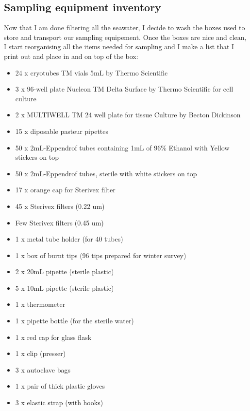 \subsection{Sampling equipment inventory}
\label{task:20180308_cj0}

Now that I am done filtering all the seawater, I decide to wash the boxes used to store and transport our sampling equipement. Once the boxes are nice and clean, I start reorganising all the items needed for sampling and I make a list that I print out and place in and on top of the box:

\begin{itemize}
\item 24 x cryotubes TM vials 5mL by Thermo Scientific
\item 3 x 96-well plate Nucleon TM Delta Surface by Thermo Scientific for cell culture
\item 2 x MULTIWELL TM 24 well plate for tissue Culture by Becton Dickinson
\item 15 x diposable pasteur pipettes
\item 50 x 2mL-Eppendrof tubes containing 1mL of 96\% Ethanol with Yellow stickers on top
\item 50 x 2mL-Eppendrof tubes, sterile with white stickers on top
\item 17 x orange cap for Sterivex filter
\item 45 x Sterivex filters (0.22 um)
\item Few Sterivex filters (0.45 um)
\item 1 x metal tube holder (for 40 tubes)
\item 1 x box of burnt tips (96 tips prepared for winter survey)
\item 2 x 20mL pipette (sterile plastic)
\item 5 x 10mL pipette (sterile plastic)
\item 1 x thermometer
\item 1 x pipette bottle (for the sterile water)
\item 1 x red cap for glass flask
\item 1 x clip (presser)
\item 3 x autoclave bags
\item 1 x pair of thick plastic gloves
\item 3 x elastic strap (with hooks)

\end{itemize}
